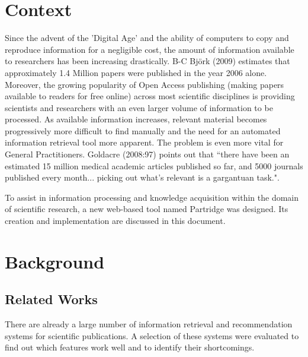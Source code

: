 %
%
\section{Context}

Since the advent of the 'Digital Age' and the ability of computers to copy and
reproduce information for a negligible cost, the amount of information
available to researchers has been increasing drastically.  B-C Bj\"{o}rk (2009)
estimates that approximately 1.4 Million papers were published in the year 2006
alone\cite{bjork2009}. Moreover, the growing popularity of Open Access
publishing (making papers available to readers for free online\cite{Suber2012})
across most scientific disciplines\cite{bjork2009}\cite{harnad2004comparing} is
providing scientists and researchers with an even larger volume of information
to be processed. As available information increases, relevant material becomes
progressively more difficult to find manually and the need for an automated
information retrieval tool more apparent. The problem is even more vital for
General Practitioners. Goldacre (2008:97) points out that ``there have been an
estimated 15 million medical academic articles published so far, and 5000
journals published every month... picking out what's relevant is a gargantuan
task."\cite{goldacre2008bad}.

To assist in information processing and knowledge acquisition within the domain
of scientific research, a new web-based tool named Partridge was designed. Its
creation and implementation are discussed in this document.

\section{Background}

\subsection{ Related Works }

There are already a large number of information retrieval and recommendation
systems for scientific publications. A selection of these systems were
evaluated to find out which features work well and to identify their
shortcomings.

